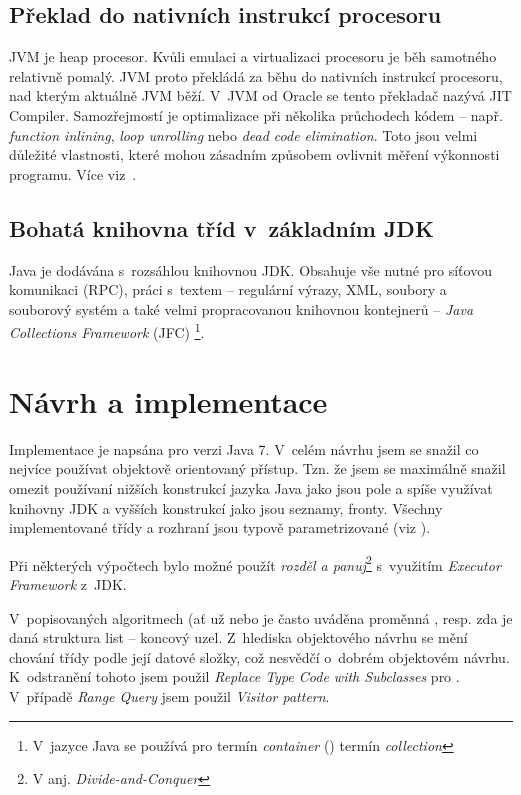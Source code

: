 \subsection{Překlad \bytecode{} do nativních instrukcí procesoru}

JVM je heap procesor.
Kvůli emulaci a virtualizaci procesoru je běh samotného \bytecode{} relativně pomalý.
JVM proto překládá za běhu \bytecode{} do nativních instrukcí procesoru, nad kterým aktuálně JVM běží.
V~JVM od Oracle se tento překladač nazývá JIT Compiler\cite{hunt2011java}.
Samozřejmostí je optimalizace při několika průchodech kódem -- např. \emph{function inlining}, \emph{loop unrolling} nebo \emph{dead code elimination}\cite{hunt2011java}.
Toto jsou velmi důležité vlastnosti, které mohou zásadním způsobem ovlivnit měření výkonnosti programu. Více viz~.

\subsection{Bohatá knihovna tříd v~základním JDK}

Java je dodávána s~rozsáhlou knihovnou JDK. Obsahuje vše nutné
pro síťovou komunikaci (RPC), práci s~textem -- regulární výrazy,
XML, soubory a souborový
systém a také velmi propracovanou knihovnou kontejnerů -- \emph{Java
Collections Framework }(JFC)
\footnote{V~jazyce Java se používá pro termín \emph{container} (\CC) termín
\emph{collection}}.

\section{Návrh a implementace}
Implementace  je napsána pro verzi Java 7.
V~celém návrhu jsem se snažil co nejvíce používat objektově orientovaný přístup.
Tzn. že jsem se maximálně snažil omezit používaní nižších konstrukcí jazyka Java jako jsou pole a spíše využívat knihovny JDK a vyšších konstrukcí jako jsou seznamy, fronty.
Všechny implementované třídy a rozhraní jsou typově parametrizované (viz ).

Při některých výpočtech bylo možné použít \emph{rozděl a panuj}\cite{Cormen:2001:IA:580470}\footnote{V anj. \emph{Divide-and-Conquer}} s~využitím \emph{Executor Framework} z~JDK.

V~popisovaných algoritmech (ať už \BPTree{} nebo \MIndex{} je často uváděna proměnná , resp. zda je daná struktura list -- koncový uzel.
Z~hlediska objektového návrhu se mění chování třídy podle její datové složky, což nesvědčí o~dobrém objektovém návrhu.
K~odstranění tohoto jsem použil \emph{Replace Type Code with Subclasses}\cite{fowler1999refactoring} pro \BPTree.
V~případě \MIndex{} \emph{Range Query} jsem použil \emph{Visitor pattern}\cite{gamma1995design}.

